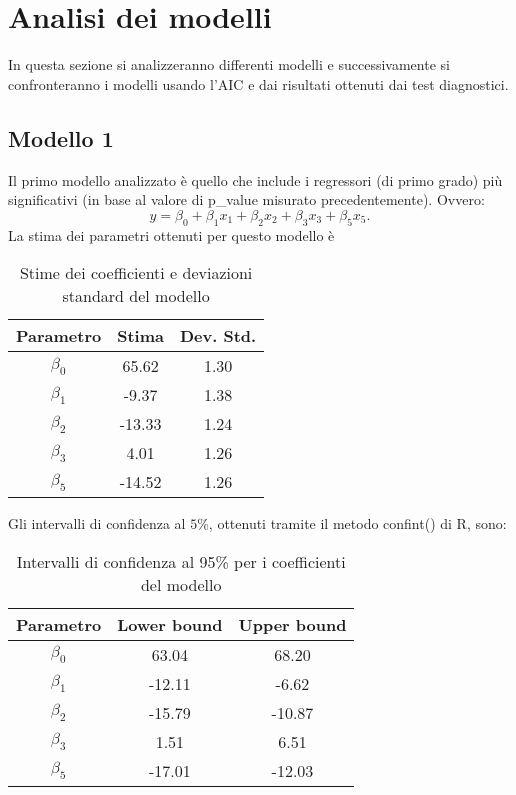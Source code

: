 \section{Analisi dei modelli}
In questa sezione si analizzeranno differenti modelli e successivamente si confronteranno i modelli usando l'AIC e dai risultati ottenuti dai test diagnostici.

\subsection{Modello 1}
Il primo modello analizzato è quello che include i regressori (di primo grado) più significativi (in base al valore di p\_value misurato precedentemente). Ovvero:
\begin{equation*}
y=\beta_0+\beta_1x_1+\beta_2x_2+\beta_3x_3+\beta_5x_5.
\end{equation*}
La stima dei parametri ottenuti per questo modello è
\begin{table}[H]
	\centering
	\begin{tabular}{|c|c|c|}
		\hline
		\textbf{Parametro} & \textbf{Stima} & \textbf{Dev. Std.} \\
		\hline
		$\beta_0$ & 65.62  & 1.30 \\
		$\beta_1$ & -9.37  & 1.38 \\
		$\beta_2$ & -13.33 & 1.24 \\
		$\beta_3$ & 4.01   & 1.26 \\
		$\beta_5$ & -14.52 & 1.26 \\
		\hline
	\end{tabular}
	\caption{Stime dei coefficienti e deviazioni standard del modello}
	\label{tab:coef_estimates}
\end{table}

Gli intervalli di confidenza al $5\%$, ottenuti tramite il metodo confint() di R, sono:
\begin{table}[H]
	\centering
	\begin{tabular}{|c|c|c|}
		\hline
		\textbf{Parametro} & \textbf{Lower bound} & \textbf{Upper bound} \\
		\hline
		$\beta_0$ & 63.04 & 68.20 \\
		$\beta_1$ & -12.11 & -6.62 \\
		$\beta_2$ & -15.79 & -10.87 \\
		$\beta_3$ & 1.51 & 6.51 \\
		$\beta_5$ & -17.01 & -12.03 \\
		\hline
	\end{tabular}
	\caption{Intervalli di confidenza al 95\% per i coefficienti del modello}
	\label{tab:ci_coefficienti}
\end{table}

